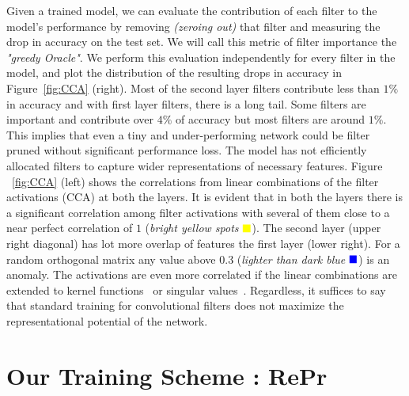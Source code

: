 Given a trained model, we can evaluate the contribution of each filter to the model's performance by removing \textit{(zeroing out)} that filter and measuring the drop in accuracy on the test set.
We will call this metric of filter importance the \emph{"greedy Oracle"}.
We perform this evaluation independently for every filter in the model, and plot the distribution of the resulting drops in accuracy in Figure~\ref{fig:CCA} (right).
Most of the second layer filters contribute less than $1\%$ in accuracy and with first layer filters, there is a long tail. 
Some filters are important and contribute over $4\%$ of accuracy but most filters are around $1\%$. 
This implies that even a tiny and under-performing network could be filter pruned without significant performance loss.
The model has not efficiently allocated filters to capture wider representations of necessary features. 
Figure ~\ref{fig:CCA} (left) shows the correlations from linear combinations of the filter activations (CCA) at both the layers.
It is evident that in both the layers there is a significant correlation among filter activations with several of them close to a near perfect correlation of $1$ (\textit{bright yellow spots} $\color{Yellow} \blacksquare$).  The second layer (upper right diagonal) has lot more overlap of features the first layer (lower right).
For a random orthogonal matrix any value above $0.3$ (\textit{lighter than dark blue} $\color{blue} \blacksquare$) is an anomaly.
The activations are even more correlated if the linear combinations are extended to kernel functions~\cite{Hardoon2004CanonicalCA} or singular values~\cite{Raghu2017SVCCASV}.
Regardless, it suffices to say that standard training for convolutional filters does not maximize the representational potential of the network.



 


\section{Our Training Scheme : RePr} \label{sec:training}

